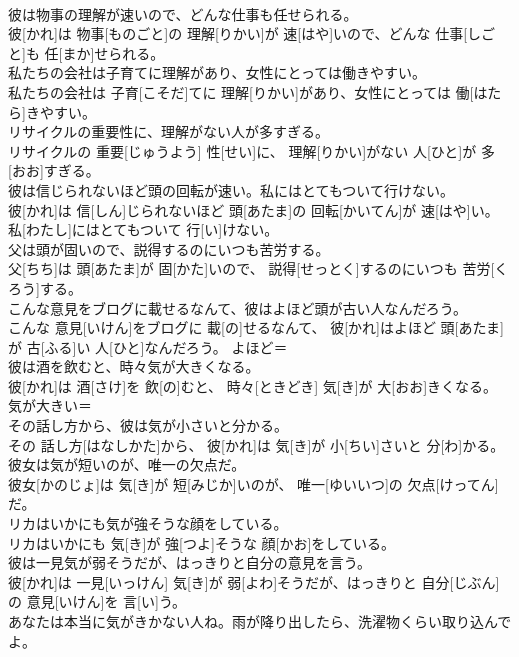 \documentclass[8pt]{extreport}
\begin{document}
\begin{CJK}{UTF8}{min}
\\	彼は物事の理解が速いので、どんな仕事も任せられる。	
\\	彼[かれ]は 物事[ものごと]の 理解[りかい]が 速[はや]いので、どんな 仕事[しごと]も 任[まか]せられる。	
\\	私たちの会社は子育てに理解があり、女性にとっては働きやすい。	
\\	私たちの会社は 子育[こそだ]てに 理解[りかい]があり、女性にとっては 働[はたら]きやすい。	
\\	リサイクルの重要性に、理解がない人が多すぎる。	
\\	リサイクルの 重要[じゅうよう] 性[せい]に、 理解[りかい]がない 人[ひと]が 多[おお]すぎる。	
\\	彼は信じられないほど頭の回転が速い。私にはとてもついて行けない。	
\\	彼[かれ]は 信[しん]じられないほど 頭[あたま]の 回転[かいてん]が 速[はや]い。 私[わたし]にはとてもついて 行[い]けない。	
\\	父は頭が固いので、説得するのにいつも苦労する。	
\\	父[ちち]は 頭[あたま]が 固[かた]いので、 説得[せっとく]するのにいつも 苦労[くろう]する。	
\\	こんな意見をブログに載せるなんて、彼はよほど頭が古い人なんだろう。	
\\	こんな 意見[いけん]をブログに 載[の]せるなんて、 彼[かれ]はよほど 頭[あたま]が 古[ふる]い 人[ひと]なんだろう。	よほど＝ 
\\	彼は酒を飲むと、時々気が大きくなる。	
\\	彼[かれ]は 酒[さけ]を 飲[の]むと、 時々[ときどき] 気[き]が 大[おお]きくなる。	気が大きい＝ 
\\	その話し方から、彼は気が小さいと分かる。	
\\	その 話し方[はなしかた]から、 彼[かれ]は 気[き]が 小[ちい]さいと 分[わ]かる。	
\\	彼女は気が短いのが、唯一の欠点だ。	
\\	彼女[かのじょ]は 気[き]が 短[みじか]いのが、 唯一[ゆいいつ]の 欠点[けってん]だ。	
\\	リカはいかにも気が強そうな顔をしている。	
\\	リカはいかにも 気[き]が 強[つよ]そうな 顔[かお]をしている。	
\\	彼は一見気が弱そうだが、はっきりと自分の意見を言う。	
\\	彼[かれ]は 一見[いっけん] 気[き]が 弱[よわ]そうだが、はっきりと 自分[じぶん]の 意見[いけん]を 言[い]う。	
\\	あなたは本当に気がきかない人ね。雨が降り出したら、洗濯物くらい取り込んでよ。	

\end{CJK}
\end{document}
